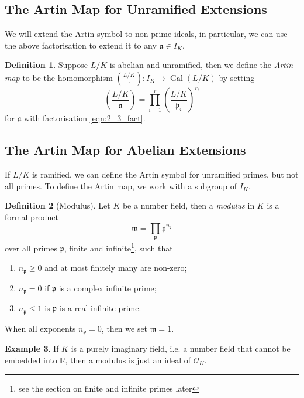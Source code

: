 \documentclass[11pt]{article}
\theoremstyle{definition}
\newtheorem{definition}{Definition}[section]
\newtheorem{example}[definition]{Example}
\theoremstyle{plain}
\theoremstyle{remark}
\DeclareMathOperator{\Gal}{Gal}
\newcommand{\RR}{\mathbb{R}}
\newcommand{\cO}{\mathcal{O}}
\newcommand{\fa}{\mathfrak{a}}
\newcommand{\fp}{\mathfrak{p}}
\newcommand{\fm}{\mathfrak{m}}
\newcommand{\leg}[2]{\left(\frac{#1}{#2}\right)}
\begin{document}
\subsection{The Artin Map for Unramified Extensions}
We will extend the Artin symbol to non-prime ideals, in particular, we can use the above factorisation to extend it to any $\fa \in I_K$.

\begin{definition}\label{def:2_4}
    Suppose $L/K$ is abelian and unramified, then we define the \emph{Artin map} to be the homomorphism $\leg{L/K}{\cdot} : I_K \to \Gal(L/K)$ by setting
    \begin{equation}\label{eqn:2_4_star}
        \leg{L/K}{\fa} = \prod_{i=1}^r \leg{L/K}{\fp_i}^{r_i}
    \end{equation}
    for $\fa$ with factorisation \eqref{eqn:2_3_fact}.
\end{definition}

\subsection{The Artin Map for Abelian Extensions}

If $L/K$ is ramified, we can define the Artin symbol for unramified primes, but not all primes. To define the Artin map, we work with a subgroup of $I_K$.

\begin{definition}[Modulus]\label{def:2_5}
    Let $K$ be a number field, then a \emph{modulus} in $K$ is a formal product
    \begin{equation*}
        \fm = \prod_\fp \fp^{n_\fp}
    \end{equation*}
    over all primes $\fp$, finite and infinite\footnote{see the section on finite and infinite primes later}, such that
    \begin{enumerate}
        \item $n_\fp \ge 0$ and at most finitely many are non-zero;
        \item $n_\fp = 0$ if $\fp$ is a complex infinite prime;
        \item $n_\fp \le 1$ is $\fp$ is a real infinite prime.
    \end{enumerate}
    When all exponents $n_\fp = 0$, then we set $\fm = 1$.
\end{definition}

\begin{example}\label{eg:2_6}
    If $K$ is a purely imaginary field, i.e. a number field that cannot be embedded into $\RR$, then a modulus is just an ideal of $\cO_K$.
\end{example}
\end{document}
